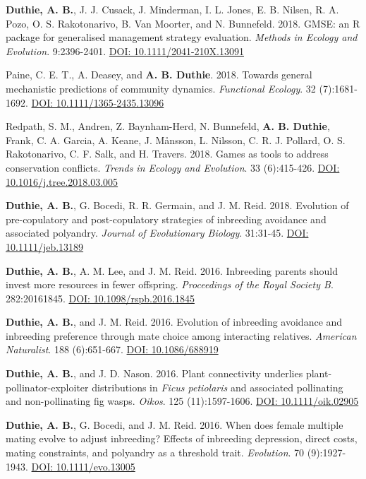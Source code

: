 \documentclass[letterpaper]{article}
\begin{document}
\begin{etaremune}
\item {\bf Duthie, A. B.}, J. J. Cusack, J. Minderman, I. L. Jones, E. B. Nilsen, R. A. Pozo, O. S. Rakotonarivo, B. Van Moorter, and N. Bunnefeld. 2018. GMSE: an R package for generalised management strategy evaluation. {\it Methods in Ecology and Evolution}. 9:2396-2401. \href{https://besjournals.onlinelibrary.wiley.com/doi/10.1111/2041-210X.13091}{DOI: 10.1111/2041-210X.13091} 
\item Paine, C. E. T., A. Deasey, and {\bf A. B. Duthie}. 2018. Towards general mechanistic predictions of community dynamics. {\it Functional Ecology}. 32 (7):1681-1692. \href{http://onlinelibrary.wiley.com/doi/10.1111/1365-2435.13096/pdf}{DOI: 10.1111/1365-2435.13096}
\item Redpath, S. M., Andren, Z. Baynham-Herd, N. Bunnefeld, {\bf A. B. Duthie}, Frank, C. A. Garcia, A. Keane, J. M\r{a}nsson, L. Nilsson, C. R. J. Pollard, O. S. Rakotonarivo, C. F. Salk, and H. Travers. 2018. Games as tools to address conservation conflicts. {\it Trends in Ecology and Evolution}. 33 (6):415-426. \href{https://www.cell.com/trends/ecology-evolution/fulltext/S0169-5347(18)30059-4}{DOI: 10.1016/j.tree.2018.03.005}
\item {\bf Duthie, A. B.}, G. Bocedi, R. R. Germain, and J. M. Reid. 2018. Evolution of pre-copulatory and post-copulatory strategies of inbreeding avoidance and associated polyandry. {\it Journal of Evolutionary Biology}. 31:31-45. \href{https://onlinelibrary.wiley.com/doi/10.1111/jeb.13189/full}{DOI: 10.1111/jeb.13189}
\item {\bf Duthie, A. B.}, A. M. Lee, and J. M. Reid. 2016. Inbreeding parents should invest more resources in fewer offspring. {\it Proceedings of the Royal Society B}. 282:20161845. \href{http://rspb.royalsocietypublishing.org/content/283/1843/20161845}{DOI: 10.1098/rspb.2016.1845}
\item {\bf Duthie, A. B.}, and J. M. Reid. 2016. Evolution of inbreeding avoidance and inbreeding preference through mate choice among interacting relatives. {\it American Naturalist}. 188 (6):651-667. \href{http://www.journals.uchicago.edu/doi/full/10.1086/688919}{DOI: 10.1086/688919}
\item {\bf Duthie, A. B.}, and J. D. Nason. 2016. Plant connectivity underlies plant-pollinator-exploiter distributions in {\it Ficus petiolaris} and associated pollinating and non-pollinating fig wasps. {\it Oikos}. 125 (11):1597-1606. \href{http://onlinelibrary.wiley.com/doi/10.1111/oik.02905/abstract}{DOI: 10.1111/oik.02905}
\item {\bf Duthie, A. B.}, G. Bocedi, and J. M. Reid. 2016. When does female multiple mating evolve to adjust inbreeding? Effects of inbreeding depression, direct costs, mating constraints, and polyandry as a threshold trait. {\it Evolution}. 70 (9):1927-1943. \href{http://onlinelibrary.wiley.com/doi/10.1111/evo.13005/abstract}{DOI: 10.1111/evo.13005}

\end{etaremune}
\end{document}
